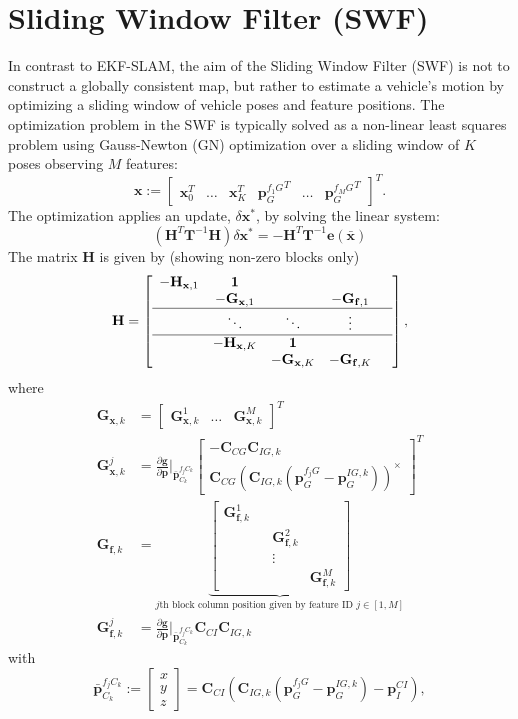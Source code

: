 \documentclass[letterpaper, 10 pt, conference]{ieeeconf}  %
\def\Vec#1{\mathbf{#1}}
\newcommand{\bbm}{\begin{bmatrix}}
\newcommand{\ebm}{\end{bmatrix}}
\newcommand{\pd}[2]{\frac{\partial #1}{\partial #2}}
\begin{document}
\section{Sliding Window Filter (SWF)} \label{sec:SWF}
In contrast to EKF-SLAM, the aim of the Sliding Window Filter (SWF) is not to construct a globally consistent map, but rather to estimate a vehicle's motion by optimizing a sliding window of vehicle poses and feature positions.
The optimization problem in the SWF is typically solved as a non-linear least squares problem using Gauss-Newton (GN) optimization over a sliding window of $K$ poses observing $M$ features: 
\begin{equation}
\Vec{x} := \bbm \Vec x_0^T & \hdots & \Vec x_K^T & {\Vec {p}_G^{f_1G}}^T & \hdots & {\Vec {p}_G^{f_MG}}^T \ebm ^T.
\end{equation}
The optimization applies an update, $ \delta \Vec{x}^*$, by solving the linear system:
\begin{equation}
(\Vec H^T \Vec T ^{-1} \Vec H ) \delta \Vec{x}^*  = - \Vec{H}^T\Vec{T}^{-1}\Vec{e}(\bar{\Vec{x}})
\end{equation}
The matrix $\Vec{H}$ is given by (showing non-zero blocks only)
\begin{equation}
\mathbf{H} = \left[\begin{array}{cccccc}
 -\Vec H_{\Vec x, 1} & \Vec 1 & & &   \\ 
 & -\Vec G_{\Vec x, 1} &  &   -\Vec G_{\Vec f, 1} \\ \hline
 & \ddots & \ddots & \vdots  \\  \hline
 & -\Vec H_{\Vec x, K} & \Vec 1 & \\ 
 & & -\Vec G_{\Vec x, K} &  -\Vec G_{\Vec f, K}   \\  
\end{array}\right], 
\end{equation}
where
\begin{align}
\Vec G_{\Vec x, k} &= \bbm \Vec G_{\Vec x, k}^1 & \hdots & \Vec G_{\Vec x, k}^M \ebm ^T
\\[0.5em]
\Vec G_{\Vec{x}, k}^j &= \pd{\Vec g}{ \Vec p}\Bigr|_{\bar{\Vec p}_{C_k}^{f_j C_k}}
    \bbm -\Vec C_{CG} \Vec C_{IG,k} \\[0.5em] \Vec C_{CG} (\Vec C_{IG,k} (\Vec{p}_G^{f_j G} - \Vec p_G^{IG,k} ) )^\times  \ebm ^T
\\[0.5em]
\Vec G_{\Vec f, k} &= \underbrace{\bbm \Vec G_{\Vec f, k}^1 & & \\ & & \Vec G_{\Vec f, k}^2 & \\ & & \vdots &  \\ & & & \Vec G_{\Vec f, k}^M \ebm}_{\text{$j$th block column position given by feature ID $j\in[1,M]$}} \\[0.5em]
\Vec G_{\Vec f, k}^j &= \pd{\Vec g}{ \Vec p}\Bigr|_{\bar{\Vec p}_{C_k}^{f_j C_k}} \Vec C_{CI} \Vec C_{IG,k}
\end{align}
with
\begin{equation}
\bar{\Vec p}_{C_k}^{f_j C_k} := \bbm x \\ y \\ z \ebm = \Vec C_{CI} \left( \Vec C_{IG,k} (\Vec{p}_G^{f_j G} - \Vec{p}_G^{IG,k} )   - \Vec p_I^{CI} \right),
\end{equation}
\end{document}
